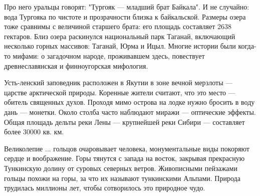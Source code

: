 \documentclass{article}
\begin{document}
Про него уральцы говорят: "Тургояк --- младший брат Байкала". И не случайно: вода Тургояка по чистоте и прозрачности
близка к байкальской. Размеры озера тоже сравнимы с величиной старшего брата: его площадь составляет 2638 гектаров.
Близ озера раскинулся национальный парк Таганай, включающий несколько горных массивов: Таганай, Юрма и Ицыл.
Многие истории были когда-то мифами: о загадочном народе, проживавшем здесь, повествует древнеславянская и
финноугорская мифология.

Усть-ленский заповедник расположен в Якутии в зоне вечной мерзлоты --- царстве арктической природы.
Коренные жители считают, что это место --- обитель священных духов. Проходя мимо острова на лодке нужно бросить в воду
дань --- монетки. Около столба часто наблюдают миражи --- оптические эффекты. Общая площадь дельты реки Лены ---
крупнейшей реки Сибири --- составляет более 30000 кв. км.

Великолепие ... гольцов очаровывает человека, монументальные виды покоряют сердце и воображение.
Горы тянутся с запада на восток, закрывая прекрасную Тункинскую долину от суровых северных ветров.
Живописными пейзажами гольцы похожи на горы, за что их называют тункинскими Альпами.
Природа трудилась миллионы лет, чтобы сотворилось это природное чудо.
\end{document}

